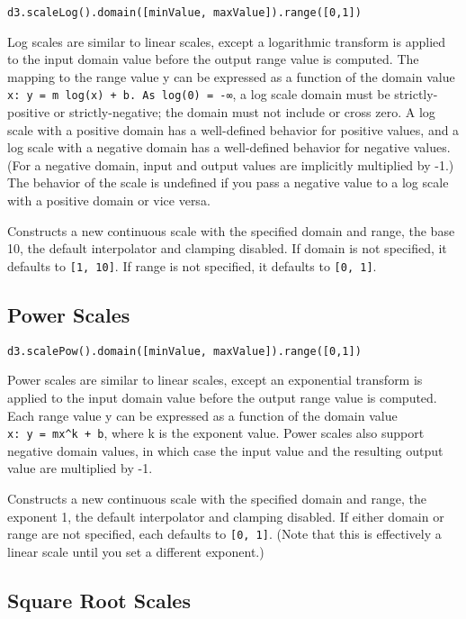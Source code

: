 \documentclass[
]{krantz}
\begin{document}
\texttt{d3.scaleLog().domain({[}minValue,\ maxValue{]}).range({[}0,1{]})}

Log scales are similar to linear scales, except a logarithmic transform is applied to the input domain value before the output range value is computed. The mapping to the range value y can be expressed as a function of the domain value \texttt{x:\ y\ =\ m\ log(x)\ +\ b.\ As\ log(0)\ =\ -∞}, a log scale domain must be strictly-positive or strictly-negative; the domain must not include or cross zero. A log scale with a positive domain has a well-defined behavior for positive values, and a log scale with a negative domain has a well-defined behavior for negative values. (For a negative domain, input and output values are implicitly multiplied by -1.) The behavior of the scale is undefined if you pass a negative value to a log scale with a positive domain or vice versa.

Constructs a new continuous scale with the specified domain and range, the base 10, the default interpolator and clamping disabled. If domain is not specified, it defaults to \texttt{{[}1,\ 10{]}}. If range is not specified, it defaults to \texttt{{[}0,\ 1{]}}.

\hypertarget{power-scales}{%
\subsection*{Power Scales}\label{power-scales}}


\texttt{d3.scalePow().domain({[}minValue,\ maxValue{]}).range({[}0,1{]})}

Power scales are similar to linear scales, except an exponential transform is applied to the input domain value before the output range value is computed. Each range value y can be expressed as a function of the domain value \texttt{x:\ y\ =\ mx\^{}k\ +\ b}, where k is the exponent value. Power scales also support negative domain values, in which case the input value and the resulting output value are multiplied by -1.

Constructs a new continuous scale with the specified domain and range, the exponent 1, the default interpolator and clamping disabled. If either domain or range are not specified, each defaults to \texttt{{[}0,\ 1{]}}. (Note that this is effectively a linear scale until you set a different exponent.)

\hypertarget{square-root-scales}{%
\subsection*{Square Root Scales}\label{square-root-scales}}
\end{document}
